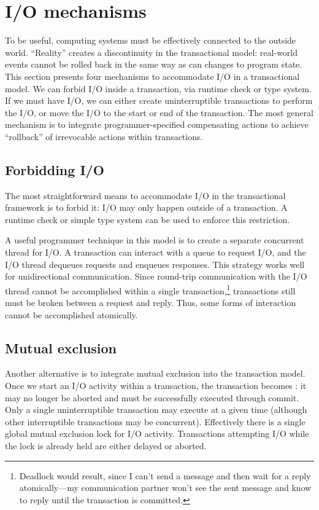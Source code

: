 \section{I/O mechanisms}\label{sec:io}
To be useful, computing systems must be effectively connected to the
outside world.  ``Reality'' creates a discontinuity in the transactional model:
real-world events cannot be rolled back in the same way as can changes
to program state.  This section presents four mechanisms to
accommodate I/O in a transactional model.  We can forbid I/O inside a
transaction, via runtime check or type system.  If we must have I/O,
we can either create uninterruptible transactions to perform the I/O,
or move the I/O to the start or end of the transaction.  The most
general mechanism is to integrate programmer-specified compensating
actions to achieve ``rollback'' of irrevocable actions within transactions.

\subsection{Forbidding I/O}
The most straightforward means to accommodate I/O in the
transactional framework is to forbid it: I/O may only happen outside
of a transaction.  A runtime check or simple type system can be used
to enforce this restriction.

A useful programmer technique in this model is to create a separate concurrent
thread for I/O\@.  A transaction can interact with a queue to request
I/O, and the I/O thread dequeues requests and enqueues responses.
This strategy works well for unidirectional communication.
Since round-trip communication with the I/O thread cannot be accomplished
within a single transaction,\footnote{Deadlock would result, since I
  can't send a message and then wait for a reply atomically---my
  communication partner won't see the sent message and know to reply
  until the transaction is committed.} transactions
still must be broken between a request and reply.  Thus, some forms of
interaction cannot be accomplished atomically.

\subsection{Mutual exclusion}
Another alternative is to integrate mutual exclusion into the
transaction model.  Once we start an I/O activity within a transaction,
the transaction becomes : it may no longer be
aborted and must be successfully executed through commit.
Only a single uninterruptible transaction may execute at a given time
(although other interruptible transactions may be concurrent).
Effectively there is a single global mutual exclusion lock for I/O
activity.  Transactions attempting I/O while the lock is already held
are either delayed or aborted.

